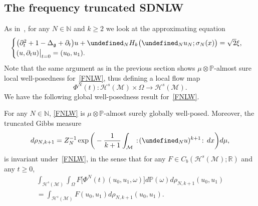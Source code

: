 \documentclass[10pt]{amsart}
\theoremstyle{definition}\newtheorem{defi}[theo]{Definition}\newtheorem{rema}[theo]{Remark}\newtheorem{exam}[theo]{Example}\newtheorem{exem}[theo]{Example}\newtheorem{nota}[theo]{Notation}
\newcommand{\R}{\mathbb{R}}
\newcommand{\Prob}{\mathbb{P}}
\newcommand{\N}{\mathbb{N}}
\let\P= \undefined
\newcommand{\P}{\mathbf{P}}
\newcommand{\M}{\mathcal{M}}
\renewcommand{\H}{\mathcal{H}}
\newcommand{\g}{\mathfrak{g}}
\newcommand{\Dlg}{\Delta_{\g}}
\newcommand{\s}{\sigma}
\newcommand{\dt}{\partial_t}
\renewcommand{\o}{\omega}
\renewcommand{\O}{\Omega}
\begin{document}
\subsection{The frequency truncated SDNLW}
As in~\cite{BO96,Tz,BT2,BTT2}, for any $N\in\N$ and $k\ge 2$ we look at the approximating equation
\begin{equation}\label{FNLW}
\begin{cases}
\big(\dt^2+1-\Dlg + \dt\big)u + \P_NH_k\big(\P_Nu_N;\s_N(x)\big) = \sqrt{2}\xi,\\
(u,\dt u)\big|_{t=0}=(u_0,u_1).
\end{cases}
\end{equation}
Note that the same argument as in the previous section shows $\mu\otimes\Prob$-almost sure local well-posedness for~\eqref{FNLW}, thus defining a local flow map
\begin{equation*}
\Phi^N(t) : \H^s(\M)\times \O \to \H^s(\M).
\end{equation*}
We have the following global well-posedness result for~\eqref{FNLW}.

\begin{prop}\label{prop-FNLW}
For any $N\in\N$, \eqref{FNLW} is $\mu\otimes\Prob$-almost surely globally well-posed. Moreover, the truncated Gibbs measure
\begin{equation}\label{rhoN}
d\rho_{N,k+1}=Z_N^{-1}\exp\bigg(-\frac{1}{k+1}\int_{\M}\,:\!(\P_N u)^{k+1}\!:\,dx\bigg)d\mu,
\end{equation}
is invariant under~\eqref{FNLW}, in the sense that for any $F\in C_b(\H^s(\M);\R)$ and any $t\ge 0$,
\begin{multline*}
\int_{\H^s(\M)}\int_\O F\big[\Phi^N(t)(u_0,u_1,\o)\big]d\Prob(\o)d\rho_{N,k+1}(u_0,u_1)\\ = \int_{\H^s(\M)}F(u_0,u_1)d\rho_{N,k+1}(u_0,u_1).
\end{multline*}
\end{prop}
\end{document}
